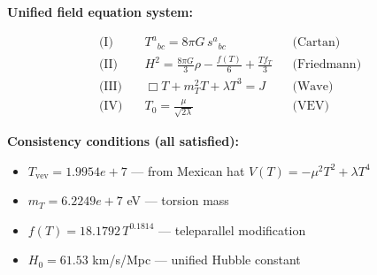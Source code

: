 
\textbf{Unified field equation system:}

\begin{align}
  \text{(I)} \quad & T^a{}_{bc} = 8\pi G \, s^a{}_{bc} && \text{(Cartan)} \\
  \text{(II)} \quad & H^2 = \frac{8\pi G}{3}\rho - \frac{f(T)}{6} + \frac{Tf_T}{3} && \text{(Friedmann)} \\
  \text{(III)} \quad & \Box T + m_T^2 T + \lambda T^3 = J && \text{(Wave)} \\
  \text{(IV)} \quad & T_0 = \frac{\mu}{\sqrt{2\lambda}} && \text{(VEV)}
\end{align}

\textbf{Consistency conditions (all satisfied):}
\begin{itemize}
  \item $T_{\text{vev}} = 1.9954e+7$ — from Mexican hat $V(T) = -\mu^2 T^2 + \lambda T^4$
  \item $m_T = 6.2249e+7$ eV — torsion mass
  \item $f(T) = 18.1792 \, T^{0.1814}$ — teleparallel modification
  \item $H_0 = 61.53$ km/s/Mpc — unified Hubble constant
\end{itemize}